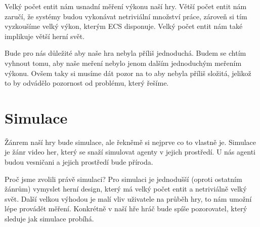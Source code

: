 Velký počet entit nám usnadní měření výkonu naší hry. Větší počet entit nám zaručí, že systémy budou vykonávat netriviální množství práce, zároveň si tím vyzkoušíme velký výkon, kterým ECS disponuje. Velký počet entit nám také implikuje větší herní svět.

Bude pro nás důležité aby naše hra nebyla příliš jednoduchá. Budem se chtím vyhnout tomu, aby naše meření nebylo jenom dalším jednoduchým meřením výkonu. Ovšem taky si musíme dát pozor na to aby nebyla příliš složitá, jelikož to by odvádělo pozornost od problému, který řešíme.


\section{Simulace}
Žánrem naší hry bude simulace, ale řekněmě si nejprve co to vlastně je. Simulace je žánr video her, který se snaží simulovat agenty v jejich prostředí. U nás agenti budou vesničani a jejich prostředí bude příroda.

Proč jsme zvolili právě simulaci? Pro simulaci je jednodušší (oproti ostatním žánrům) vymyslet herní design, který má velký počet entit a netriviálně velký svět. Další velkou výhodou je malí vliv uživatele na průběh hry, to nám umožní lépe provádět měření. Konkrétně v naší hře hráč bude spíše pozorovatel, který sleduje jak simulace probíhá.

